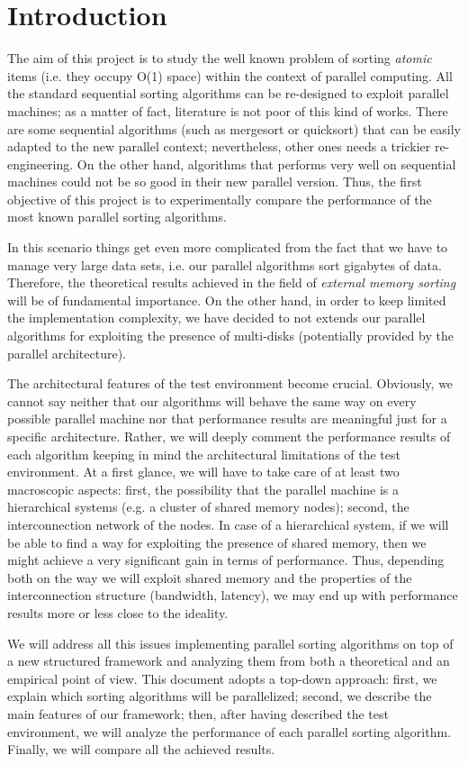 \section{Introduction}
The aim of this project is to study the well known problem of sorting \textit{atomic} items (i.e. they occupy O(1) space) within the context of parallel computing. All the standard sequential sorting algorithms can be re-designed to exploit parallel machines; as a matter of fact, literature is not poor of this kind of works. There are some sequential algorithms (such as mergesort or quicksort) that can be easily adapted to the new parallel context; nevertheless, other ones needs a trickier re-engineering. On the other hand, algorithms that performs very well on sequential machines could not be so good in their new parallel version. Thus, the first objective of this project is to experimentally compare the performance of the most known parallel sorting algorithms. 

In this scenario things get even more complicated from the fact that we have to manage very large data sets, i.e. our parallel algorithms sort gigabytes of data. Therefore, the theoretical results achieved in the field of \textit{external memory sorting} will be of fundamental importance. On the other hand, in order to keep limited the implementation complexity, we have decided to not extends our parallel algorithms for exploiting the presence of multi-disks (potentially provided by the parallel architecture). 

The architectural features of the test environment become crucial. Obviously, we cannot say neither that our algorithms will behave the same way on every possible parallel machine nor that performance results are meaningful just for a specific architecture. Rather, we will deeply comment the performance results of each algorithm keeping in mind the architectural limitations of the test environment. At a first glance, we will have to take care of at least two macroscopic aspects: first, the possibility that the parallel machine is a hierarchical systems (e.g. a cluster of shared memory nodes); second, the interconnection network of the nodes. In case of a hierarchical system, if we will be able to find a way for exploiting the presence of shared memory, then we might achieve a very significant gain in terms of performance. Thus, depending both on the way we will exploit shared memory and the properties of the interconnection structure (bandwidth, latency), we may end up with performance results more or less close to the ideality.

We will address all this issues implementing parallel sorting algorithms on top of a new structured framework and analyzing them from both a theoretical and an empirical point of view. This document adopts a top-down approach: first, we explain which sorting algorithms will be parallelized; second, we describe the main features of our framework; then, after having described the test environment, we will analyze the performance of each parallel sorting algorithm. Finally, we will compare all the achieved results.
